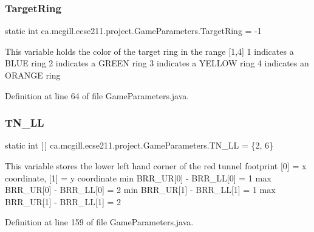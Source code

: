 \subsubsection{\texorpdfstring{Target\+Ring}{TargetRing}}
{\footnotesize\ttfamily  static  int ca.\+mcgill.\+ecse211.\+project.\+Game\+Parameters.\+Target\+Ring = -\/1\hspace{0.3cm}{\ttfamily [static]}}

This variable holds the color of the target ring in the range \mbox{[}1,4\mbox{]} 1 indicates a B\+L\+UE ring 2 indicates a G\+R\+E\+EN ring 3 indicates a Y\+E\+L\+L\+OW ring 4 indicates an O\+R\+A\+N\+GE ring 

Definition at line 64 of file Game\+Parameters.\+java.

\mbox{\label{enumca_1_1mcgill_1_1ecse211_1_1project_1_1_game_parameters_aff67c7474a260a8bcbb245a7c7d5b009}} 
\subsubsection{\texorpdfstring{T\+N\+\_\+\+LL}{TN\_LL}}
{\footnotesize\ttfamily  static  int \mbox{[}$\,$\mbox{]} ca.\+mcgill.\+ecse211.\+project.\+Game\+Parameters.\+T\+N\+\_\+\+LL = \{2, 6\}\hspace{0.3cm}{\ttfamily [static]}}

This variable stores the lower left hand corner of the red tunnel footprint \mbox{[}0\mbox{]} = x coordinate, \mbox{[}1\mbox{]} = y coordinate min B\+R\+R\+\_\+\+UR\mbox{[}0\mbox{]} -\/ B\+R\+R\+\_\+\+LL\mbox{[}0\mbox{]} = 1 max B\+R\+R\+\_\+\+UR\mbox{[}0\mbox{]} -\/ B\+R\+R\+\_\+\+LL\mbox{[}0\mbox{]} = 2 min B\+R\+R\+\_\+\+UR\mbox{[}1\mbox{]} -\/ B\+R\+R\+\_\+\+LL\mbox{[}1\mbox{]} = 1 max B\+R\+R\+\_\+\+UR\mbox{[}1\mbox{]} -\/ B\+R\+R\+\_\+\+LL\mbox{[}1\mbox{]} = 2 

Definition at line 159 of file Game\+Parameters.\+java.

\mbox{\label{enumca_1_1mcgill_1_1ecse211_1_1project_1_1_game_parameters_aa47abaface63a254570f9a82c4e1fe0d}} 
